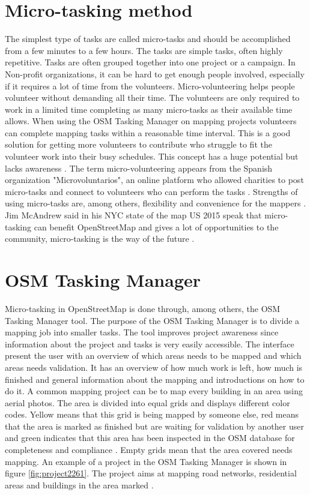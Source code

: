 \section{Micro-tasking method}
The simplest type of tasks are called micro-tasks and should be accomplished from a few minutes to a few hours. The tasks are simple tasks, often highly repetitive. Tasks are often grouped together into one project or a campaign. In Non-profit organizations, it can be hard to get enough people involved, especially if it requires a lot of time from the volunteers. Micro-volunteering helps people volunteer without demanding all their time. The volunteers are only required to work in a limited time completing as many micro-tasks as their available time allows. When using the OSM Tasking Manager on mapping projects volunteers can complete mapping tasks within a reasonable time interval. This is a good solution for getting more volunteers to contribute who struggle to fit the volunteer work into their busy schedules. This concept has a huge potential but lacks awareness \cite{Bernstein}. The term micro-volunteering appears from the Spanish organization "Microvoluntarios", an online platform who allowed charities to post micro-tasks and connect to volunteers who can perform the tasks \cite{Madalena}.  Strengths of using micro-tasks are, among others, flexibility and convenience for the mappers \cite{Madalena}. Jim McAndrew said in his NYC state of the map US 2015 speak that micro-tasking can benefit OpenStreetMap and gives a lot of opportunities to the community, micro-tasking is the way of the future \cite{McAndrew2015}.  

\section{OSM Tasking Manager}
Micro-tasking in OpenStreetMap is done through, among others, the OSM Tasking Manager tool. The purpose of the OSM Tasking Manager is to divide a mapping job into smaller tasks. The tool improves project awareness since information about the project and tasks is very easily accessible. The interface present the user with an overview of which areas needs to be mapped and which areas needs validation. It has an overview of how much work is left, how much is finished and general information about the mapping and introductions on how to do it. A common mapping project can be to map every building in an area using aerial photos. The area is divided into equal grids and displays different color codes. Yellow means that this grid is being mapped by someone else, red means that the area is marked as finished but are waiting for validation by another user and green indicates that this area has been inspected in the OSM database for completeness and compliance \cite{Palen2015}. Empty grids mean that the area covered needs mapping. An example of a project in the OSM Tasking Manager is shown in figure \ref{fig:project2261}. The project aims at mapping road networks, residential areas and buildings in the area marked \cite{HOTTaskingManager2016}.  

